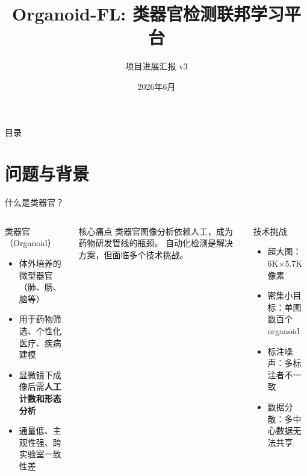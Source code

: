 \documentclass[aspectratio=169, 10pt]{beamer}
\title[Organoid-FL]{Organoid-FL: 类器官检测联邦学习平台}
\subtitle{项目进展汇报 v3}
\date{2026年6月}
\begin{document}
\begin{frame}[plain]
  \titlepage
\end{frame}

\begin{frame}{目录}
  \tableofcontents
\end{frame}

\section{问题与背景}

\begin{frame}{什么是类器官？}
  \begin{columns}[T]
    \begin{block}{类器官（Organoid）}
      \begin{itemize}
        \item 体外培养的微型器官（肺、肠、脑等）
        \item 用于药物筛选、个性化医疗、疾病建模
        \item 显微镜下成像后需\textbf{人工计数和形态分析}
        \item 通量低、主观性强、跨实验室一致性差
      \end{itemize}
    \end{block}
    \vspace{0em}
    \begin{alertblock}{核心痛点}
      类器官图像分析依赖人工，成为药物研发管线的瓶颈。
      自动化检测是解决方案，但面临多个技术挑战。
    \end{alertblock}
    \begin{block}{技术挑战}
      \begin{itemize}
        \item \alert{超大图}：6K$\times$5.7K 像素
        \item \alert{密集小目标}：单图数百个 organoid
        \item \alert{标注噪声}：多标注者不一致
        \item \alert{数据分散}：多中心数据无法共享
      \end{itemize}
    \end{block}
  \end{columns}
\end{frame}
\end{document}
